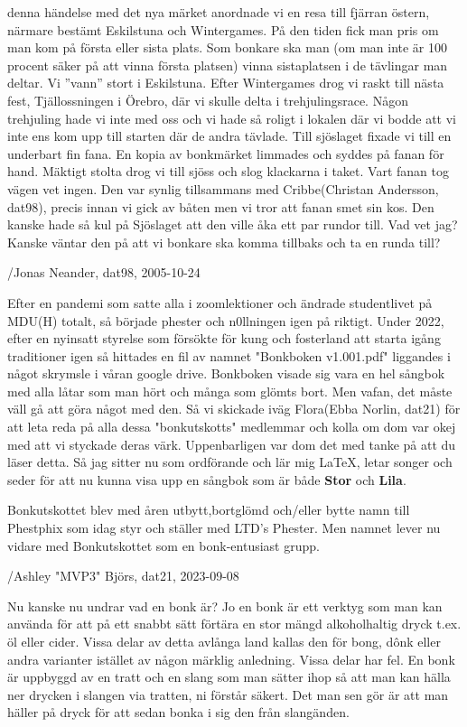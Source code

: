 denna händelse med det nya märket anordnade vi en resa till fjärran östern, närmare bestämt Eskilstuna och Wintergames. På den tiden fick man pris om man kom på första eller sista plats. Som bonkare ska man (om man inte är 100 procent säker på att vinna första platsen) vinna sistaplatsen i de tävlingar man deltar. Vi ”vann” stort i Eskilstuna. Efter Wintergames drog vi raskt till nästa fest, Tjällossningen i Örebro, där vi skulle delta i trehjulingsrace. Någon trehjuling hade vi inte med oss och vi hade så roligt i lokalen där vi bodde att vi inte ens kom upp till starten där de andra tävlade. Till sjöslaget fixade vi till en underbart fin fana. En kopia av bonkmärket limmades och syddes på fanan för hand. Mäktigt stolta drog vi till sjöss och slog klackarna i taket. Vart fanan tog vägen vet ingen. Den var synlig tillsammans med Cribbe(Christan Andersson, dat98), precis innan vi gick av båten men vi tror att fanan smet sin kos. Den kanske hade så kul på Sjöslaget att den ville åka ett par rundor till. Vad vet jag? Kanske väntar den på att vi bonkare ska komma tillbaks och ta en runda till? 

/Jonas Neander, dat98, 2005-10-24

Efter en pandemi som satte alla i zoomlektioner och ändrade studentlivet på MDU(H) totalt, så började phester och n0llningen igen på riktigt. Under 2022, efter en nyinsatt styrelse som försökte för kung och fosterland att starta igång traditioner igen så hittades en fil av namnet "Bonkboken v1.001.pdf" liggandes i något skrymsle i våran google drive. Bonkboken visade sig vara en hel sångbok med alla låtar som man hört och många som glömts bort. Men vafan, det måste väll gå att göra något med den. Så vi skickade iväg Flora(Ebba Norlin, dat21) för att leta reda på alla dessa "bonkutskotts" medlemmar och kolla om dom var okej med att vi styckade deras värk. Uppenbarligen var dom det med tanke på att du läser detta. Så jag sitter nu som ordförande och lär mig LaTeX, letar songer och seder för att nu kunna visa upp en sångbok som är både \textbf{Stor} och \textbf{Lila}. 

Bonkutskottet blev med åren utbytt,bortglömd och/eller bytte namn till Phestphix som idag styr och ställer med LTD's Phester. Men namnet lever nu vidare med Bonkutskottet som en bonk-entusiast grupp.

/Ashley "MVP3" Björs, dat21, 2023-09-08\newpage


Nu kanske nu undrar vad en bonk är? Jo en bonk är ett verktyg som man kan använda för att på ett snabbt sätt förtära en stor mängd alkoholhaltig dryck t.ex. öl eller cider. Vissa delar av detta avlånga land kallas den för bong, dônk eller andra varianter istället av någon märklig anledning. Vissa delar har fel. En bonk är uppbyggd av en tratt och en slang som man sätter ihop så att man kan hälla ner drycken i slangen via tratten, ni förstår säkert. Det man sen gör är att man häller på dryck för att sedan bonka i sig den från slangänden. 

